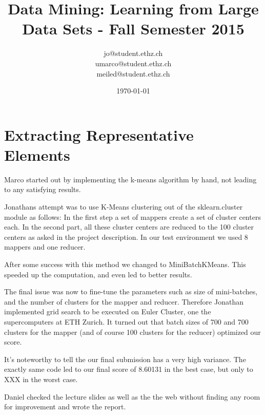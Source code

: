 \documentclass[a4paper, 11pt]{article}
\title{Data Mining: Learning from Large Data Sets - Fall Semester 2015}
\author{jo@student.ethz.ch\\ umarco@student.ethz.ch\\ meiled@student.ethz.ch\\}
\date{\today}
\begin{document}
\maketitle

\section*{Extracting Representative Elements}

Marco started out by implementing the k-means algorithm by hand, not leading to any satisfying results.

Jonathans attempt was to use K-Means clustering out of the sklearn.cluster module as follows: In the first step a set of mappers create a set of cluster centers each. In the second part, all these cluster centers are reduced to the 100 cluster centers as asked in the project description. In our test environment we used 8 mappers and one reducer. 

After some success with this method we changed to MiniBatchKMeans. This speeded up the computation, and even led to better results.

The final issue was now to fine-tune the parameters such as size of mini-batches, and the number of clusters for the mapper and reducer. Therefore Jonathan implemented grid search to be executed on Euler Cluster, one the supercomputers at ETH Zurich. It turned out that batch sizes of 700 and 700 clusters for the mapper (and of course 100 clusters for the reducer) optimized our score.

It's noteworthy to tell the our final submission has a very high variance. The exactly same code led to our final score  of 8.60131 in the best case, but only to  XXX in the worst case.

Daniel checked the lecture slides as well as the the web without finding any room for improvement and wrote the report.
\end{document}
